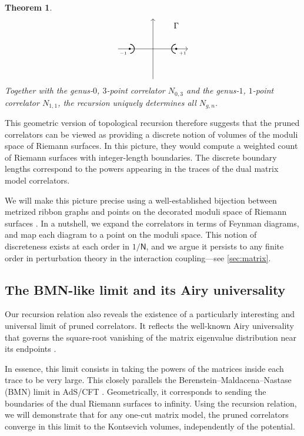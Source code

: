 \documentclass[a4paper,11pt,english]{article}
\theoremstyle{plain}
\theoremstyle{definition}
\theoremstyle{plain}
\newtheorem{introthm}{Theorem}
\newcommand{\ms}[1]{\mathsf{#1}}
\begin{document}
\begin{introthm}
\begin{equation}
\begin{tikzpicture}[baseline={(0, 0cm)}]
            \fill[white] (1,0) circle (.2cm);
            \fill[white] (-1,0) circle (.2cm);
            \draw[->] (-1.5,0) -- (1.5,0);
            \draw[->] (0,-1.3) -- (0,1.3);
            \node at (1,0) {\tiny$\bullet$};
            \node at (1,0) [below right] {\tiny$+1$};
            \node at (-1,0) {\tiny$\bullet$};
            \node at (-1,0) [below left] {\tiny$-1$};
            \node at (1,1) {$\Gamma$};
            \clip (0,0) circle (1cm);
            \draw[thick] (1,0) circle (.2cm);
            \draw[thick] (-1,0) circle (.2cm);
        \end{tikzpicture}
    \end{equation}
    Together with the genus-$0$, $3$-point correlator $N_{0,3}$ and the genus-$1$, $1$-point correlator $N_{1,1}$, the recursion uniquely determines all $N_{g,n}$.
\end{introthm}

This geometric version of topological recursion therefore suggests that the pruned correlators can be viewed as providing a discrete notion of volumes of the moduli space of Riemann surfaces. In this picture, they would compute a weighted count of Riemann surfaces with integer-length boundaries. The discrete boundary lengths correspond to the powers appearing in the traces of the dual matrix model correlators.

We will make this picture precise using a well-established bijection between metrized ribbon graphs and points on the decorated moduli space of Riemann surfaces \cite{Str84,Kon92}. In a nutshell, we expand the correlators in terms of Feynman diagrams, and map each diagram to a point on the moduli space. This notion of discreteness exists at each order in $1/\ms{N}$, and we argue it persists to any finite order in perturbation theory in the interaction coupling---see \cref{sec:matrix}.

\subsection{The BMN-like limit and its Airy universality}
Our recursion relation also reveals the existence of a particularly interesting and universal limit of pruned correlators. It reflects the well-known Airy universality that governs the square-root vanishing of the matrix eigenvalue distribution near its endpoints \cite{TW94,Eyn16,BrezinHikamiAiry,BrezinZee}.

In essence, this limit consists in taking the powers of the matrices inside each trace to be very large. This closely parallels the Berenstein--Maldacena--Nastase (BMN) limit in AdS/CFT \cite{BMN02}. Geometrically, it corresponds to sending the boundaries of the dual Riemann surfaces to infinity. Using the recursion relation, we will demonstrate that for any one-cut matrix model, the pruned correlators converge in this limit to the Kontsevich volumes, independently of the potential. 
\end{document}

